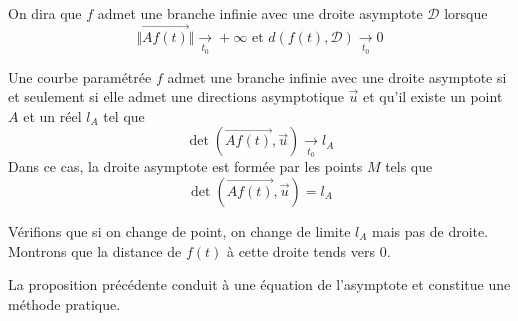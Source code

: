 \begin{defi}[Asymptote]
 On dira que $f$ admet une branche infinie avec une droite asymptote $\mathcal D$ lorsque 
\begin{displaymath}
 \Vert \overrightarrow{Af(t)}\Vert \xrightarrow[t_0]{} +\infty 
\text{ et }
d(f(t),\mathcal D) \xrightarrow[t_0]{} 0
\end{displaymath}
\end{defi}
\begin{prop}
 Une courbe paramétrée $f$ admet une branche infinie avec une droite asymptote si et seulement si elle admet une directions asymptotique $\overrightarrow u$ et qu'il existe un point $A$ et un réel $l_A$ tel que
\begin{displaymath}
 \det(\overrightarrow{Af(t)},\overrightarrow u)\xrightarrow[t_0]{} l_A
\end{displaymath}
Dans ce cas, la droite asymptote est formée par les points $M$ tels que
\begin{displaymath}
 \det(\overrightarrow{Af(t)},\overrightarrow u)= l_A
\end{displaymath}
\end{prop}
\begin{demo}
  Vérifions que si on change de point, on change de limite $l_A$ mais pas de droite.
  Montrons que la distance de $f(t)$ à cette droite tends vers $0$.
\end{demo}
La proposition précédente conduit à une équation de l'asymptote et constitue une méthode pratique.
